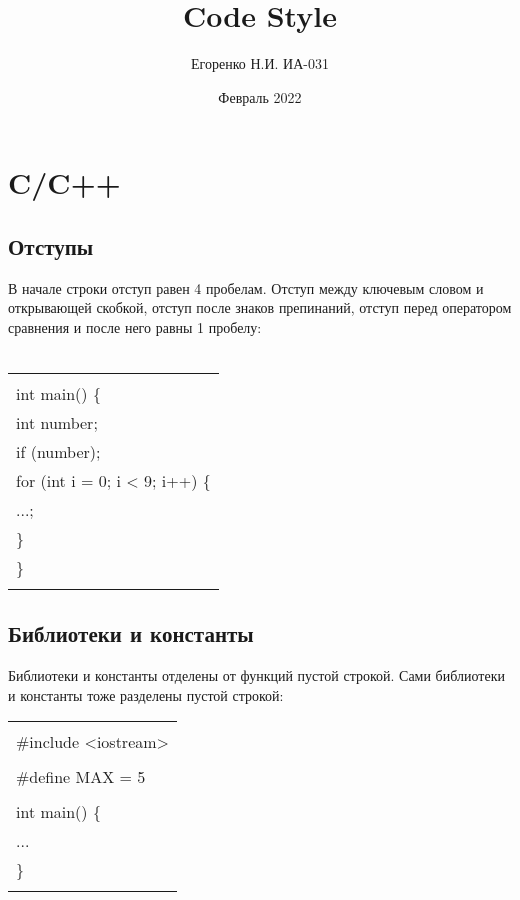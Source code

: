 \documentclass{article}
\title{Code Style}
\author{Егоренко Н.И. ИА-031}
\affil{email: kotkit555@gmail.com,  github: @FrenkyFix}
\date{Февраль 2022}
\begin{document}
\maketitle

\section{C/C++}
\subsection{Отступы}
В начале строки отступ равен 4 пробелам. Отступ между ключевым словом и открывающей скобкой, отступ после знаков препинаний, отступ перед оператором сравнения и после него равны 1 пробелу:\\\\
\newcommand*{\Tab}{\hspace*{0.5cm}}
\begin{center}
\begin{tabular}{ | l | }
\hline
\\
int main() \{\\
\Tab int number;\\
\Tab if (number);\\
\Tab for (int i = 0; i < 9; i++) \{\\
\Tab\Tab ...;\\
\Tab \}\\
\}\\\\
\hline
\end{tabular}
\end{center}
\newpage
\subsection{Библиотеки и константы}
Библиотеки и константы отделены от функций пустой строкой. Сами библиотеки и константы тоже разделены пустой строкой:
\begin{center}
\begin{tabular}{ | l | }
\hline
\\
\#include <iostream> \\\\
\#define MAX = 5 \\\\
int main() \{\\
\Tab ...\\
\}\\\\
\hline
\end{tabular}
\end{center}
\\\\
\end{document}
